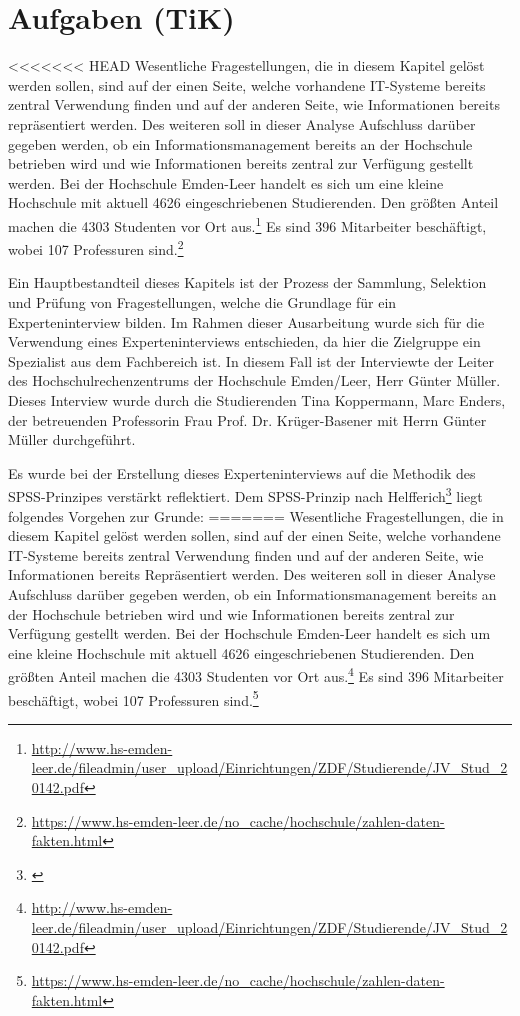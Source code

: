 \section{Aufgaben (TiK)}
<<<<<<< HEAD
Wesentliche Fragestellungen, die in diesem Kapitel gelöst werden sollen, sind auf der einen Seite, welche vorhandene IT-Systeme bereits zentral Verwendung finden und auf der anderen Seite, wie Informationen bereits repräsentiert werden. Des weiteren soll in dieser Analyse Aufschluss darüber gegeben werden, ob ein Informationsmanagement bereits an der Hochschule betrieben wird und wie Informationen bereits zentral zur Verfügung gestellt werden.  
Bei der Hochschule Emden-Leer handelt es sich um eine kleine Hochschule mit aktuell 4626 eingeschriebenen Studierenden. Den größten Anteil machen die 4303 Studenten vor Ort aus.\footnote{\url{http://www.hs-emden-leer.de/fileadmin/user_upload/Einrichtungen/ZDF/Studierende/JV_Stud_20142.pdf}} Es sind 396 Mitarbeiter beschäftigt, wobei 107 Professuren sind.\footnote{\url{https://www.hs-emden-leer.de/no_cache/hochschule/zahlen-daten-fakten.html}}

Ein Hauptbestandteil dieses Kapitels ist der Prozess der Sammlung, Selektion und Prüfung von Fragestellungen, welche die Grundlage für ein Experteninterview bilden. Im Rahmen dieser Ausarbeitung wurde sich für die Verwendung eines Experteninterviews entschieden, da hier die Zielgruppe ein Spezialist aus dem Fachbereich ist. In diesem Fall ist der Interviewte der Leiter des Hochschulrechenzentrums der Hochschule Emden/Leer, Herr Günter Müller. Dieses Interview wurde durch die Studierenden Tina Koppermann, Marc Enders, der betreuenden Professorin Frau Prof. Dr. Krüger-Basener mit Herrn Günter Müller durchgeführt. 

Es wurde bei der Erstellung dieses Experteninterviews auf die Methodik des SPSS-Prinzipes verstärkt reflektiert. Dem SPSS-Prinzip nach Helfferich\footnote{\cite{helfferich_2009}} liegt folgendes Vorgehen zur Grunde:
=======
Wesentliche Fragestellungen, die in diesem Kapitel gelöst werden sollen, sind auf der einen Seite, welche vorhandene IT-Systeme bereits zentral Verwendung finden und auf der anderen Seite, wie Informationen bereits Repräsentiert werden. Des weiteren soll in dieser Analyse Aufschluss darüber gegeben werden, ob ein Informationsmanagement bereits an der Hochschule betrieben wird und wie Informationen bereits zentral zur Verfügung gestellt werden.  
Bei der Hochschule Emden-Leer handelt es sich um eine kleine Hochschule mit aktuell 4626 eingeschriebenen Studierenden. Den größten Anteil machen die 4303 Studenten vor Ort aus.\footnote{\url{http://www.hs-emden-leer.de/fileadmin/user_upload/Einrichtungen/ZDF/Studierende/JV_Stud_20142.pdf}} Es sind 396 Mitarbeiter beschäftigt, wobei 107 Professuren sind.\footnote{\url{https://www.hs-emden-leer.de/no_cache/hochschule/zahlen-daten-fakten.html}}

